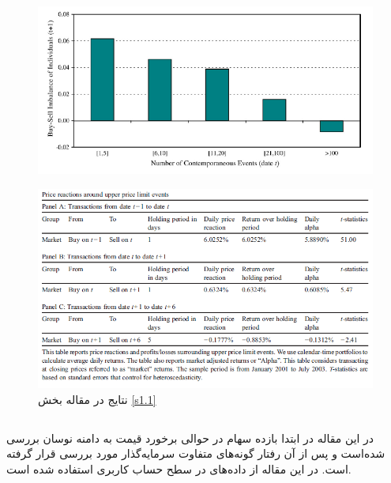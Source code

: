 \documentclass[12pt]{article}
\begin{document}
\begin{figure}[htbp]
\centering
\includegraphics[width=\columnwidth]{g1.png}
\end{figure}
\FloatBarrier
\begin{figure}[htbp]
\includegraphics[width=\columnwidth]{Table4.png}
\caption{ نتایج  در مقاله بخش \ref {s1.1}}
\label{g2}
\end{figure}
\FloatBarrier
\subsection{}
\label{s1.2}
در این مقاله در ابتدا بازده سهام در حوالی برخورد قیمت به دامنه نوسان بررسی شده‌است و پس از آن رفتار گونه‌های متفاوت سرمایه‌گذار مورد بررسی قرار گرفته است. در این مقاله از داده‌های در سطح حساب کاربری استفاده شده است.
\end{document}
